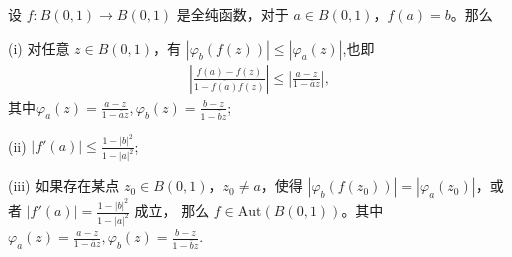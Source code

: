 \documentclass[../../main.tex]{subfiles}%
\begin{document}
\begin{theorem}\label{theorem:Schwarz-Pick定理-定理4.5.6}
设 \( f: B(0,1) \to B(0,1) \) 是全纯函数，对于 \( a \in B(0,1) \)，\( f(a) = b \)。那么

(i) 对任意 \( z \in B(0,1) \)，有 \( |\varphi_b(f(z))| \leqslant  |\varphi_a(z)| \),也即
\begin{align*}
\left|\frac{f(a) - f(z)}{1 - \overline{f(a)}f(z)}\right| \leqslant \left|\frac{a - z}{1 - \overline{a} z}\right|,
\end{align*}
其中$\varphi_a(z) = \frac{a - z}{1 - \overline{a} z},\varphi_b(z) = \frac{b - z}{1 - \overline{b} z}$;

(ii) \( |f'(a)| \leqslant  \frac{1 - |b|^2}{1 - |a|^2} \);

(iii) 如果存在某点 \( z_0 \in B(0,1) \)，\( z_0 \neq a \)，使得 \( |\varphi_b(f(z_0))| = |\varphi_a(z_0)| \)，或者 \( |f'(a)| = \frac{1 - |b|^2}{1 - |a|^2} \) 成立，
那么 \( f \in \text{Aut}(B(0,1)) \)。其中$\varphi_a(z) = \frac{a - z}{1 - \overline{a} z},\varphi_b(z) = \frac{b - z}{1 - \overline{b} z}.$
\end{theorem}
\end{document}
